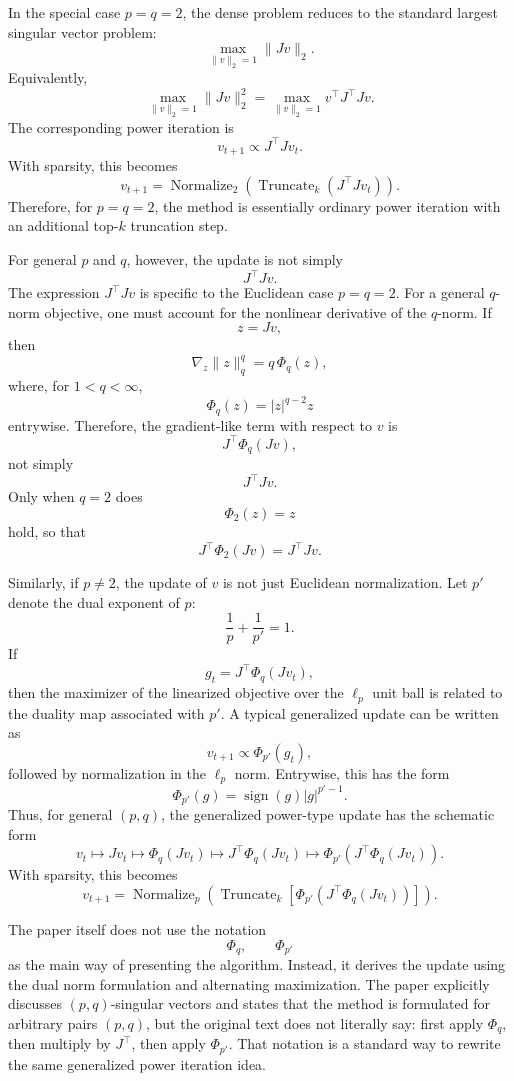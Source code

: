 \documentclass{article}
\begin{document}
In the special case \(p=q=2\), the dense problem reduces to the standard largest singular vector problem:
\[
    \max_{\|v\|_2=1}
    \|Jv\|_2.
\]
Equivalently,
\[
    \max_{\|v\|_2=1}
    \|Jv\|_2^2
    =
    \max_{\|v\|_2=1}
    v^\top J^\top J v.
\]
The corresponding power iteration is
\[
    v_{t+1}
    \propto
    J^\top J v_t.
\]
With sparsity, this becomes
\[
    v_{t+1}
    =
    \operatorname{Normalize}_{2}
    \left(
        \operatorname{Truncate}_{k}
        \left(
            J^\top J v_t
        \right)
    \right).
\]
Therefore, for \(p=q=2\), the method is essentially ordinary power iteration with an additional top-\(k\) truncation step.

For general \(p\) and \(q\), however, the update is not simply
\[
    J^\top Jv.
\]
The expression \(J^\top Jv\) is specific to the Euclidean case \(p=q=2\). For a general \(q\)-norm objective, one must account for the nonlinear derivative of the \(q\)-norm. If
\[
    z = Jv,
\]
then
\[
    \nabla_z \|z\|_q^q
    =
    q\,\Phi_q(z),
\]
where, for \(1<q<\infty\),
\[
    \Phi_q(z)
    =
    |z|^{q-2}z
\]
entrywise. Therefore, the gradient-like term with respect to \(v\) is
\[
    J^\top \Phi_q(Jv),
\]
not simply
\[
    J^\top Jv.
\]
Only when \(q=2\) does
\[
    \Phi_2(z)=z
\]
hold, so that
\[
    J^\top \Phi_2(Jv)=J^\top Jv.
\]

Similarly, if \(p\neq 2\), the update of \(v\) is not just Euclidean normalization. Let \(p'\) denote the dual exponent of \(p\):
\[
    \frac{1}{p}+\frac{1}{p'}=1.
\]
If
\[
    g_t
    =
    J^\top \Phi_q(Jv_t),
\]
then the maximizer of the linearized objective over the \(\ell_p\) unit ball is related to the duality map associated with \(p'\). A typical generalized update can be written as
\[
    v_{t+1}
    \propto
    \Phi_{p'}(g_t),
\]
followed by normalization in the \(\ell_p\) norm. Entrywise, this has the form
\[
    \Phi_{p'}(g)
    =
    \operatorname{sign}(g)|g|^{p'-1}.
\]
Thus, for general \((p,q)\), the generalized power-type update has the schematic form
\[
    v_t
    \longmapsto
    Jv_t
    \longmapsto
    \Phi_q(Jv_t)
    \longmapsto
    J^\top \Phi_q(Jv_t)
    \longmapsto
    \Phi_{p'}
    \left(
        J^\top \Phi_q(Jv_t)
    \right).
\]
With sparsity, this becomes
\[
    v_{t+1}
    =
    \operatorname{Normalize}_{p}
    \left(
        \operatorname{Truncate}_{k}
        \left[
            \Phi_{p'}
            \left(
                J^\top \Phi_q(Jv_t)
            \right)
        \right]
    \right).
\]

The paper itself does not use the notation
\[
    \Phi_q,\qquad \Phi_{p'}
\]
as the main way of presenting the algorithm. Instead, it derives the update using the dual norm formulation and alternating maximization. The paper explicitly discusses \((p,q)\)-singular vectors and states that the method is formulated for arbitrary pairs \((p,q)\), but the original text does not literally say: first apply \(\Phi_q\), then multiply by \(J^\top\), then apply \(\Phi_{p'}\). That notation is a standard way to rewrite the same generalized power iteration idea.
\end{document}
